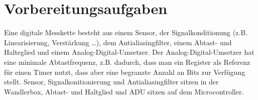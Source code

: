 %     


\section{Vorbereitungsaufgaben}


\bq

Eine digitale Messkette besteht aus einem Sensor, der Signalkonditionung (z.B.
Linearisierung, Verstärkung \ldots), dem Antialiasingfilter, einem Abtast- und
Halteglied und einem Analog-Digital-Umsetzer.
Der Analog-Digital-Umsetzer hat eine minimale Abtastfrequenz, z.B. dadurch, dass
man ein Register als Referenz für einen Timer nutzt, dass aber eine begranzte
Anzahl an Bits zur Verfügung stellt.
Sensor, Signalkonitionierung und Antialiasingfilter sitzen in der Wandlerbox,
Abtast- und Haltglied und ADU sitzen auf dem Microcontroller.
\eq

